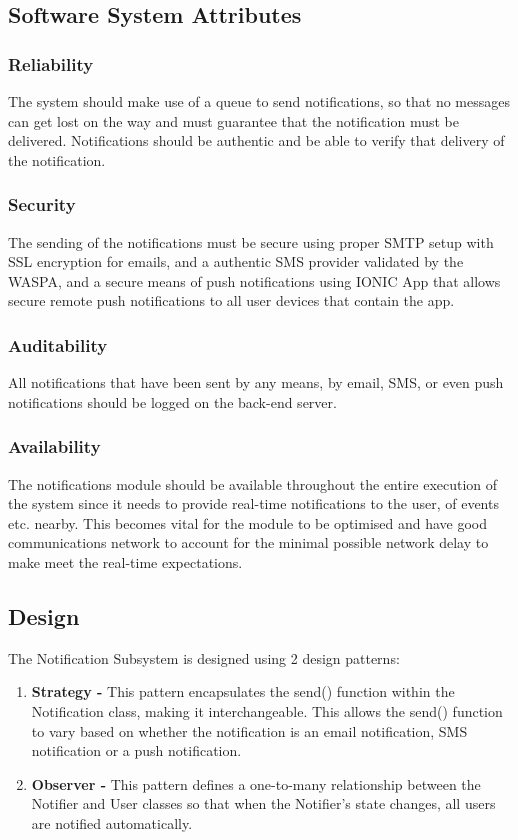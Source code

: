 \subsection{Software System Attributes}
\subsubsection{Reliability}
The system should make use of a queue to send notifications, so that no messages can get lost on the way and must guarantee that the notification must be delivered.
Notifications should be authentic and be able to verify that delivery of the notification.

\subsubsection{Security}
The sending of the notifications must be secure using proper SMTP setup with SSL encryption for emails, and a authentic SMS provider validated by the WASPA, and a secure means of push notifications using IONIC App that allows secure remote push notifications to all user devices that contain the app.

\subsubsection{Auditability}
All notifications that have been sent by any means, by email, SMS, or even push notifications should be logged on the back-end server.

\subsubsection{Availability}
The notifications module should be available throughout the entire execution of the system since it needs to provide real-time notifications to the user, of events etc. nearby. This becomes vital for the module to be optimised and have good communications network to account for the minimal possible network delay to make meet the real-time expectations.



\subsection{Design}
The Notification Subsystem is designed using 2 design patterns:
\begin{enumerate}
	\item \textbf{Strategy - } This pattern encapsulates the send() function within the Notification class, making it interchangeable. This allows the send() function to vary based on whether the notification is an email notification, SMS notification or a push notification.	
	\item \textbf{Observer - } This pattern defines a one-to-many relationship between the Notifier and User classes so that when the Notifier's state changes, all users are notified automatically.
\end{enumerate}
\newpage
